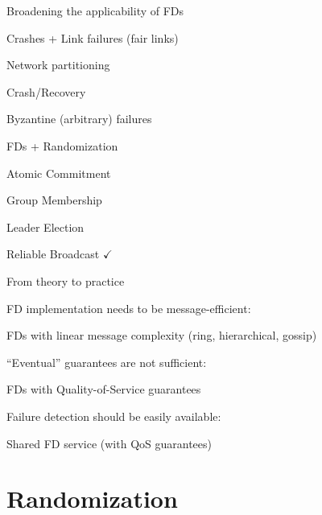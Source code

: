 \begin{frame}{Broadening the applicability of  FDs}
	
\BI
\item Crashes + Link failures (fair links)
\item Network partitioning
\item Crash/Recovery
\item Byzantine (arbitrary) failures
\item FDs + Randomization
\EI

\bigskip
{}
\BI
\item Atomic Commitment
\item Group Membership
\item Leader Election
\item Reliable Broadcast \qquad $\checkmark$
\EI

\end{frame}

\begin{frame}[shrink=3]{From theory to practice}
	
\BIL
\item \alert{FD implementation needs to be message-efficient}:
	\BI
	\item FDs with linear message complexity (ring, hierarchical, gossip) 
	\EI
\item \alert{“Eventual” guarantees are not sufficient}:
	\BI
	\item FDs with Quality-of-Service guarantees
	\EI
\item \alert{Failure detection should be easily available}:
	\BI
	\item Shared FD service (with QoS guarantees)
	\EI
\EIL

\bigskip
\begin{Bib}
\BI
\item {}
\item {}
\EI
\end{Bib}


\end{frame}

\section{Randomization}

